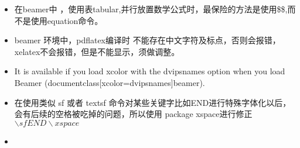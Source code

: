 \begin{itemize}
    \item 在beamer中 ，使用表tabular,并行放置数学公式时，最保险的方法是使用\$\$,而不是使用equation命令。
    \item beamer 环境中，pdflatex编译时 不能存在中文字符及标点，否则会报错，xelatex不会报错，但是不能显示，须做调整。
    \item It is available if you load xcolor with the dvipsnames option when you load Beamer (documentclass[xcolor=dvipsnames]{beamer}).
    
    \item 在使用类似 sf 或者 textsf 命令对某些关键字比如END进行特殊字体化以后，会有后续的空格被吃掉的问题，所以使用 package xspace进行修正 $\backslash sf END \backslash xspace$
    
    
    \item 
\end{itemize}


